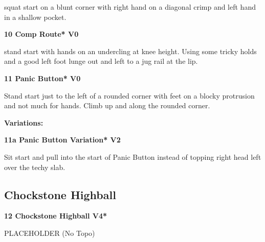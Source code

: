 \begin{multicols}{2}
					\begin{adjustwidth}{0.5cm}{}				
					squat start on a blunt corner with right hand on a diagonal crimp and left hand in a shallow pocket.
					\end{adjustwidth}

					\label{rt:Comp Route}
\colorbox{green!20}{
\parbox{0.95\linewidth}{
\textbf{
10 Comp Route* V0   
}
}
}

					\begin{adjustwidth}{0.5cm}{}				
					stand start with hands on an undercling at knee height. Using some tricky holds and a good left foot lunge out and left to a jug rail at the lip.
					\end{adjustwidth}
					\label{rt:Panic Button}
\colorbox{green!20}{
\parbox{0.95\linewidth}{
\textbf{
11 Panic Button* V0   
}
}
}

					\begin{adjustwidth}{0.5cm}{}				
					Stand start just to the left of a rounded corner with feet on a blocky protrusion and not much for hands. Climb up and along the rounded corner.
					\end{adjustwidth}
						\begin{adjustwidth}{0.5cm}{}				
						\textbf{Variations:} \newline
							\label{vr:Panic Button Variation}
\colorbox{green!20}{
\parbox{0.95\linewidth}{
\textbf{
11a Panic Button Variation* V2    
}
}
}

							\begin{adjustwidth}{0.5cm}{}				
							Sit start and pull into the start of Panic Button instead of topping right head left over the techy slab.
							\end{adjustwidth}
						\end{adjustwidth}
			\subsection*{Chockstone Highball}\label{bf:Chockstone Highball}
						
					\label{rt:Chockstone Highball}
\colorbox{RoyalBlue!20}{
\parbox{0.95\linewidth}{
\textbf{
12 Chockstone Highball V4*  
}
}
}

					\begin{adjustwidth}{0.5cm}{}				
					PLACEHOLDER
						\newline (No Topo) 
					\end{adjustwidth}

\end{multicols}

